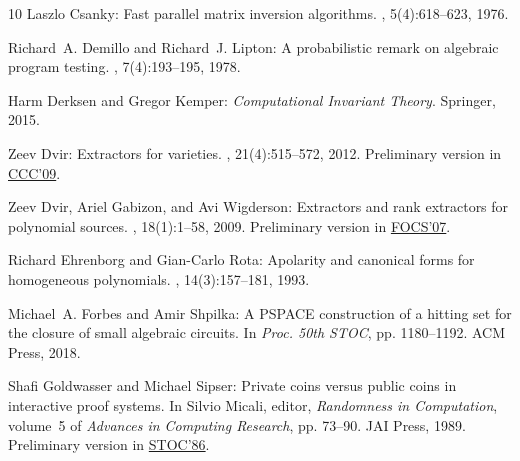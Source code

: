 \documentclass[11pt]{article}
\numberwithin{equation}{section}
\theoremstyle{definition}
\theoremstyle{plain}
\begin{document}
\begin{thebibliography}{10}
{\sc Laszlo Csanky}: Fast parallel matrix inversion algorithms.
, 5(4):618--623, 1976.
\newblock [\epfmtdoi{10.1137/0205040}]

{\sc Richard~A. Demillo and Richard~J. Lipton}: A probabilistic remark on
  algebraic program testing.
, 7(4):193--195, 1978.
\newblock [\epfmtdoi{10.1016/0020-0190(78)90067-4}]

{\sc Harm Derksen and Gregor Kemper}: {\em Computational Invariant Theory}.
\newblock Springer, 2015.
\newblock [\epfmtdoi{10.1007/978-3-662-48422-7}]

{\sc Zeev Dvir}: Extractors for varieties.
, 21(4):515--572, 2012.
\newblock Preliminary version in
  \href{https://ieeexplore.ieee.org/document/5231245}{CCC'09}.
\newblock [\epfmtdoi{10.1007/s00037-011-0023-3}]

{\sc Zeev Dvir, Ariel Gabizon, and Avi Wigderson}: Extractors and rank
  extractors for polynomial sources.
, 18(1):1--58, 2009.
\newblock Preliminary version in
  \href{https://ieeexplore.ieee.org/document/4389479}{FOCS'07}.
\newblock [\epfmtdoi{10.1007/s00037-009-0258-4}]

{\sc Richard Ehrenborg and Gian-Carlo Rota}: Apolarity and canonical forms for
  homogeneous polynomials.
, 14(3):157--181, 1993.

{\sc Michael~A. Forbes and Amir Shpilka}: A {PSPACE} construction of a hitting
  set for the closure of small algebraic circuits.
\newblock In {\em Proc. 50th STOC}, pp. 1180--1192. ACM Press, 2018.
\newblock [\epfmtdoi{10.1145/3188745.3188792}]

{\sc Shafi Goldwasser and Michael Sipser}: Private coins versus public coins in
  interactive proof systems.
\newblock In {\sc Silvio Micali}, editor, {\em Randomness in Computation},
  volume~5 of {\em Advances in Computing Research}, pp. 73--90. JAI Press,
  1989.
\newblock Preliminary version in
  \href{https://doi.org/10.1145/12130.12137}{STOC'86}.


\end{thebibliography}
\end{document}
